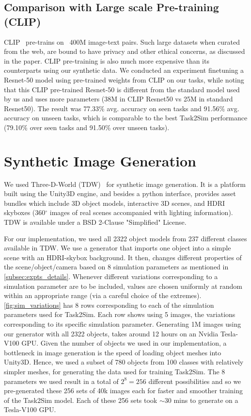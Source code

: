 \subsection{Comparison with Large scale Pre-training (CLIP)} CLIP~\cite{radford2021learning} pre-trains on ~400M image-text pairs. Such large datasets when curated from the web, are bound to have privacy and other ethical concerns, as discussed in the paper. CLIP pre-training is also much more expensive than its counterparts using our synthetic data. We conducted an experiment finetuning a Resnet-50 model using pre-trained weights from CLIP on our tasks, while noting that this CLIP pre-trained Resnet-50 is different from the standard model used by us and uses more parameters (38M in CLIP Resnet50 vs 25M in standard Resnet50). The result was 77.33\% avg. accuracy on seen tasks and 91.56\% avg. accuracy on unseen tasks, which is comparable to the best Task2Sim performance (79.10\% over seen tasks and 91.50\% over unseen tasks).





\section{Synthetic Image Generation} \label{sec:syn-data}



We used Three-D-World (TDW)~\cite{gan2020threedworld} for synthetic image generation. It is a platform built using the Unity3D engine, and besides a python interface, provides asset bundles which include 3D object models, interactive 3D scenes, and HDRI skyboxes (360$^\circ$ images of real scenes accompanied with lighting information). TDW is available under a BSD 2-Clause "Simplified" License.

For our implementation, we used all 2322 object models from 237 different classes available in TDW. We use a generator that imports one object into a simple scene with an HDRI-skybox background. It then, changes different properties of the scene/object/camera based on 8 simulation parameters as mentioned in \cref{subsec:expts_details}. Whenever different variations corresponding to a simulation parameter are to be included, values are chosen uniformly at random within an appropriate range (via a careful choice of the extremes). \cref{fig:sim_variations} has 8 rows corresponding to each of the simulation parameters used for Task2Sim. Each row shows using 5 images, the variations corresponding to its specific simulation parameter. 
Generating 1M images using our generator with all 2322 objects, takes around 12 hours on an Nvidia Tesla-V100 GPU. Given the number of objects we used in our implementation, a bottleneck in image generation is the speed of loading object meshes into Unity3D. Hence, we used a subset of 780 objects from 100 classes with relatively simpler meshes, for generating the data used for training Task2Sim. The 8 parameters we used result in a total of $2^8 = 256$ different possibilities and so we pre-generated these 256 sets of 40k images each for faster and smoother training of the Task2Sim model. Each of these 256 sets took $\sim$30 mins to generate on a Tesla-V100 GPU.

